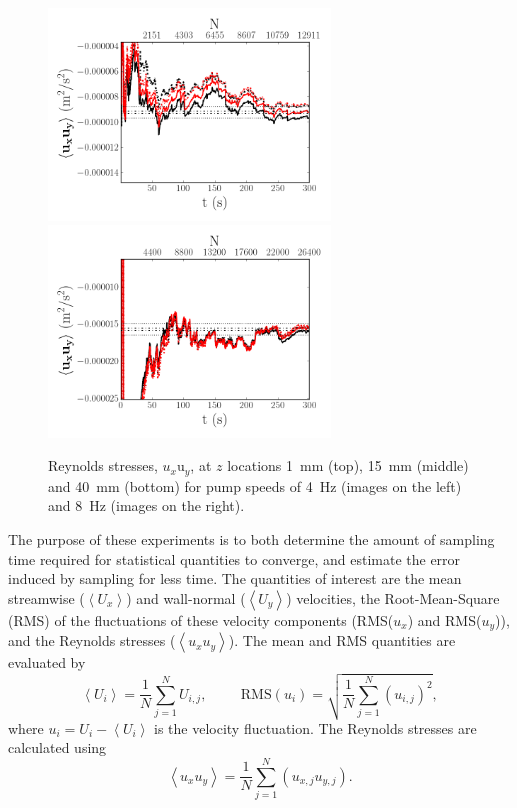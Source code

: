 \documentclass[12pt,oneside,a4paper]{article}
\begin{document}
\begin{figure}
\includegraphics[width=7.5cm]{images/LDA_timeDependenceImages/4hz_x_400_z_40_uv.png}\hfill
\includegraphics[width=7.5cm]{images/LDA_timeDependenceImages/8hz_x_400_z_40_uv.png}\\
\caption{Reynolds stresses, $u_x \text{u}_y$, at $z$ locations \SI{1}{mm} (top), \SI{15}{mm} (middle) and \SI{40}{mm} (bottom) for pump speeds of \SI{4}{Hz} (images on the left) and \SI{8}{Hz} (images on the right).}
\label{figure:experiments:timeDependence:uv}
\end{figure}
The purpose of these experiments is to both determine the amount of sampling time required for statistical quantities to converge, and estimate the error induced by sampling for less time. The quantities of interest are the mean streamwise ($\left<U_x\right>$) and wall-normal ($\left<U_y\right>$) velocities, the Root-Mean-Square (RMS) of the fluctuations of these velocity components (RMS($u_x$) and RMS($u_y$)), and the Reynolds stresses ($\left<u_x u_y \right>$). The mean and RMS quantities are evaluated by
\begin{equation}
\left<U_i\right> = \frac{1}{N}\sum^N_{j=1} U_{i,j}, \hspace{1cm}
\text{RMS}(u_i) = \sqrt{\frac{1}{N}\sum^N_{j=1} (u_{i,j})^2},
\end{equation}
where $u_i= U_i - \left<U_i\right>$ is the velocity fluctuation. The Reynolds stresses are calculated using
\begin{equation}
\left< u_x u_y \right> = \frac{1}{N}\sum^N_{j=1} (u_{x,j} u_{y,j}).
\end{equation}
\end{document}
